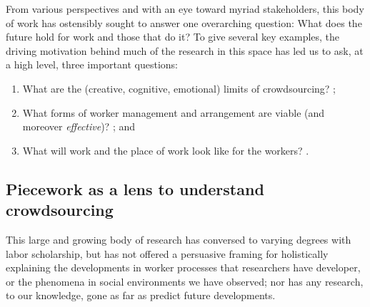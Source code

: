\documentclass[trackingWork]{subfiles}
\begin{document}
From various perspectives and with an eye toward myriad stakeholders,
this body of work has ostensibly sought to answer one overarching question:
What does the future hold for work and those that do it? %
To give several key examples,
the driving motivation behind much of the research in this space has led us to ask,
at a high level, three important questions:
\begin{enumerate}
  \item What are the (creative, cognitive, emotional) limits of crowdsourcing?
    \cite{foundry,suzukiAtelier,KimStoria,yuanAlmost,YuEncouragingOutside,embracingErrorKrishna,Nebeling:2016:WCW:2858036.2858169,Hahn:2016:KAB:2858036.2858364};
  \item What forms of worker management and arrangement are viable (and moreover \textit{effective})?
    \cite{bernsteinSoylent,sensitiveTasks,LykourentzouPersonalityMatters,KucherbaevReLauncher,Law:2016:CKC:2858036.2858144,Cai:2016:CRI:2858036.2858237,Chang:2016:ACC:2858036.2858411,Newell:2016:OMA:2858036.2858490}; and%
  \item What will work and the place of work look like for the workers?
    \cite{turkopticon,storiesIraniSilberman,dynamo,crowdcollab,whyWouldAnyoneBrewer,takingAHITMcInnis}.
\end{enumerate}











\subsection{Piecework as a lens to understand crowdsourcing}
This large and growing body of research has conversed
to varying degrees with labor scholarship,
but has not offered a persuasive framing for holistically explaining
the developments in worker processes that researchers have developer, or
the phenomena in social environments we have observed;
nor has any research, to our knowledge,
gone as far as predict future developments.

\end{document}
